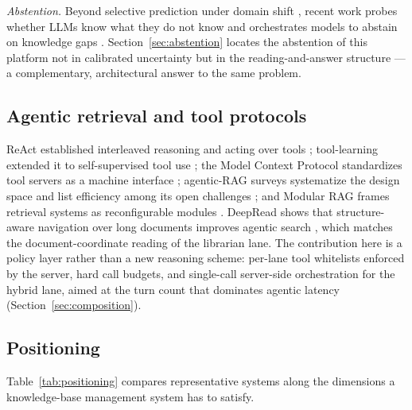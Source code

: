 \emph{Abstention.} Beyond selective prediction under domain shift
\citep{kamath}, recent work probes whether LLMs know what they do not know
\citep{yin-knowwhat} and orchestrates models to abstain on knowledge gaps
\citep{feng-abstain}. Section~\ref{sec:abstention} locates the abstention of
this platform not in calibrated uncertainty but in the reading-and-answer
structure --- a complementary, architectural answer to the same problem.

\subsection{Agentic retrieval and tool protocols}
ReAct established interleaved reasoning and acting over tools \citep{react-yao};
tool-learning extended it to self-supervised tool use \citep{toolformer}; the
Model Context Protocol standardizes tool servers as a machine interface
\citep{mcp}; agentic-RAG surveys systematize the design space and list
efficiency among its open challenges \citep{singh-agentic-rag}; and Modular RAG
frames retrieval systems as reconfigurable modules \citep{modular-rag}. DeepRead
shows that structure-aware navigation over long documents improves agentic
search \citep{deepread}, which matches the document-coordinate reading of the
librarian lane. The contribution here is a policy layer rather than a new
reasoning scheme: per-lane tool whitelists enforced by the server, hard call
budgets, and single-call server-side orchestration for the hybrid lane, aimed
at the turn count that dominates agentic latency
(Section~\ref{sec:composition}).

\subsection{Positioning}
Table~\ref{tab:positioning} compares representative systems along the
dimensions a knowledge-base management system has to satisfy.

